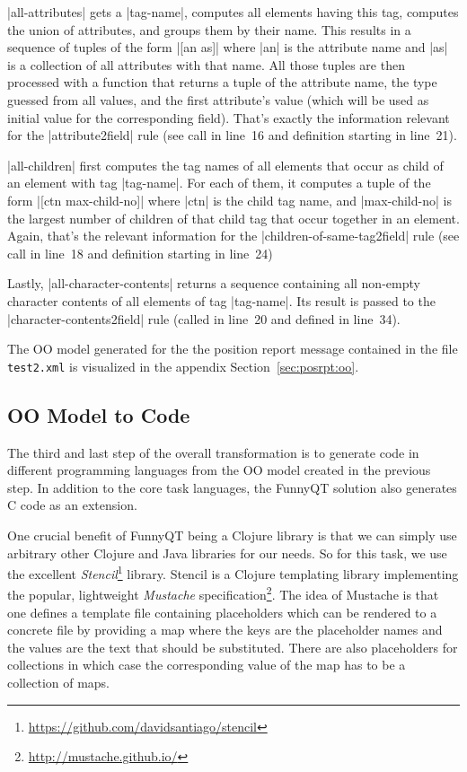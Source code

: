 \documentclass[a4paper]{article}
\newcommand{\code}{\clojureinline}
\begin{document}
\code|all-attributes| gets a \code|tag-name|, computes all elements having this
tag, computes the union of attributes, and groups them by their name.  This
results in a sequence of tuples of the form \code|[an as]| where \code|an| is
the attribute name and \code|as| is a collection of all attributes with that
name.  All those tuples are then processed with a function that returns a tuple
of the attribute name, the type guessed from all values, and the first
attribute's value (which will be used as initial value for the corresponding
field).  That's exactly the information relevant for the \code|attribute2field|
rule (see call in line~16 and definition starting in line~21).

\code|all-children| first computes the tag names of all elements that occur as
child of an element with tag \code|tag-name|.  For each of them, it computes a
tuple of the form \code|[ctn max-child-no]| where \code|ctn| is the child tag
name, and \code|max-child-no| is the largest number of children of that child
tag that occur together in an element.  Again, that's the relevant information
for the \code|children-of-same-tag2field| rule (see call in line~18 and
definition starting in line~24)

Lastly, \code|all-character-contents| returns a sequence containing all
non-empty character contents of all elements of tag \code|tag-name|.  Its
result is passed to the \code|character-contents2field| rule (called in line~20
and defined in line~34).

The OO model generated for the the position report message contained in the
file \texttt{test2.xml} is visualized in the appendix
Section~\ref{sec:posrpt:oo}.

\subsection{OO Model to Code}
\label{sec:oo-model-to-code}

The third and last step of the overall transformation is to generate code in
different programming languages from the OO model created in the previous step.
In addition to the core task languages, the FunnyQT solution also generates C
code as an extension.

One crucial benefit of FunnyQT being a Clojure library is that we can simply
use arbitrary other Clojure and Java libraries for our needs.  So for this
task, we use the excellent
\emph{Stencil}\footnote{\url{https://github.com/davidsantiago/stencil}}
library.  Stencil is a Clojure templating library implementing the popular,
lightweight \emph{Mustache}
specification\footnote{\url{http://mustache.github.io/}}.  The idea of Mustache
is that one defines a template file containing placeholders which can be
rendered to a concrete file by providing a map where the keys are the
placeholder names and the values are the text that should be substituted.
There are also placeholders for collections in which case the corresponding
value of the map has to be a collection of maps.
\end{document}
